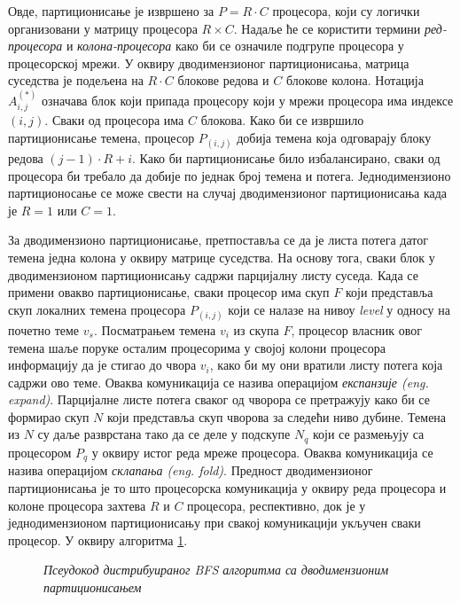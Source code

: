 \par
Овде, партиционисање је извршено за $P = R \cdot C$ процесора, који су логички организовани у матрицу процесора $R \times C$. Надаље ће се користити термини \textit{ред-процесора} и \textit{колона-процесора} како би се означиле подгрупе процесора у процесорској мрежи. У оквиру дводимензионог партиционисања, матрица суседства је подељена на $R \cdot C$ блокове редова и $C$ блокове колона. Нотација $A_{i, j}^{(*)}$ означава блок који припада процесору који у мрежи процесора има индексе $(i, j)$. Сваки од процесора има $C$ блокова. Како би се извршило партиционисање темена, процесор $P_{(i, j)}$ добија темена која одговарају блоку редова $(j - 1) \cdot R + i$. Како би партиционисање било избалансирано, сваки од процесора би требало да добије по једнак број темена и потега. Једнодимензионо партиционосање се може свести на случај дводимензионог партиционисања када је $R = 1$ или $C = 1$.

\par
За дводимензионо партиционисање, претпоставља се да је листа потега датог темена једна колона у оквиру матрице суседства. На основу тога, сваки блок у дводимензионом партиционисању садржи парцијалну листу суседа. Када се примени овакво партиционисање, сваки процесор има скуп $F$ који представља скуп локалних темена процесора $P_{(i,j)}$ који се налазе на нивоу \textit{level} у односу на почетно теме $v_s$. Посматрањем темена $v_i$ из скупа $F$, процесор власник овог темена шаље поруке осталим процесорима у својој колони процесора информацију да је стигао до чвора $v_i$, како би му они вратили листу потега која садржи ово теме. Оваква комуникација се назива операцијом \textit{експанзије (eng. expand)}. Парцијалне листе потега сваког од чворора се претражују како би се формирао скуп $N$ који представља скуп чворова за следећи ниво дубине. Темена из $N$ су даље разврстана тако да се деле у подскупе $N_q$ који се размењују са процесором $P_q$ у оквиру истог реда мреже процесора. Оваква комуникација се назива операцијом \textit{склапања (eng. fold)}. Предност дводимензионог партиционисања је то што процесорска комуникација у оквиру реда процесора и колоне процесора захтева $R$ и $C$ процесора, респективно, док је у једнодимензионом партиционисању при свакој комуникацији укључен сваки процесор. У оквиру алгоритма \ref{pseudocode:algorithm-bfs-distance-2D-par-pseudo}.

\begin{figure}[!ht]
    \centering
    
    \caption{\textit{Псеудокод дистрибуираног BFS алгоритма са дводимензионим партиционисањем}}
    \label{pseudocode:algorithm-bfs-distance-2D-par-pseudo}
\end{figure}


